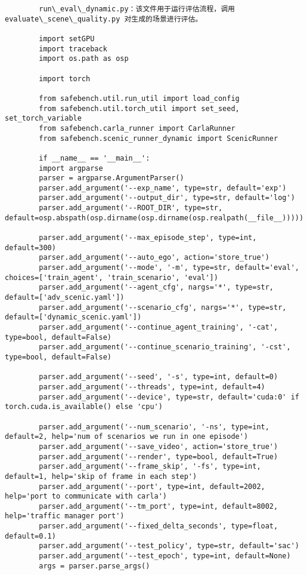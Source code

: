 	
\begin{lstlisting}
		run\_eval\_dynamic.py：该文件用于运行评估流程，调用evaluate\_scene\_quality.py 对生成的场景进行评估。

		import setGPU
		import traceback
		import os.path as osp
		
		import torch 
		
		from safebench.util.run_util import load_config
		from safebench.util.torch_util import set_seed, set_torch_variable
		from safebench.carla_runner import CarlaRunner
		from safebench.scenic_runner_dynamic import ScenicRunner
		
		if __name__ == '__main__':
		import argparse
		parser = argparse.ArgumentParser()
		parser.add_argument('--exp_name', type=str, default='exp')
		parser.add_argument('--output_dir', type=str, default='log')
		parser.add_argument('--ROOT_DIR', type=str, default=osp.abspath(osp.dirname(osp.dirname(osp.realpath(__file__)))))
		
		parser.add_argument('--max_episode_step', type=int, default=300)
		parser.add_argument('--auto_ego', action='store_true')
		parser.add_argument('--mode', '-m', type=str, default='eval', choices=['train_agent', 'train_scenario', 'eval'])
		parser.add_argument('--agent_cfg', nargs='*', type=str, default=['adv_scenic.yaml'])
		parser.add_argument('--scenario_cfg', nargs='*', type=str, default=['dynamic_scenic.yaml'])
		parser.add_argument('--continue_agent_training', '-cat', type=bool, default=False)
		parser.add_argument('--continue_scenario_training', '-cst', type=bool, default=False)
		
		parser.add_argument('--seed', '-s', type=int, default=0)
		parser.add_argument('--threads', type=int, default=4)
		parser.add_argument('--device', type=str, default='cuda:0' if torch.cuda.is_available() else 'cpu')   
		
		parser.add_argument('--num_scenario', '-ns', type=int, default=2, help='num of scenarios we run in one episode')
		parser.add_argument('--save_video', action='store_true')
		parser.add_argument('--render', type=bool, default=True)
		parser.add_argument('--frame_skip', '-fs', type=int, default=1, help='skip of frame in each step')
		parser.add_argument('--port', type=int, default=2002, help='port to communicate with carla')
		parser.add_argument('--tm_port', type=int, default=8002, help='traffic manager port')
		parser.add_argument('--fixed_delta_seconds', type=float, default=0.1)
		parser.add_argument('--test_policy', type=str, default='sac')
		parser.add_argument('--test_epoch', type=int, default=None)
		args = parser.parse_args()
		

\end{lstlisting}
